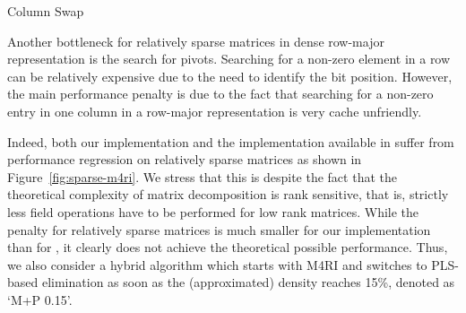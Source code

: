 \begin{algorithm}[htbp]
\caption{Column Swap}
\label{alg:swap} 
\end{algorithm}

Another bottleneck for relatively sparse matrices in dense row-major representation is the search for pivots. Searching for a non-zero element in a row can be relatively expensive due to the need to identify the bit position. However, the main performance penalty is due to the fact that searching for a non-zero entry in one column in a row-major representation is very cache unfriendly.

Indeed, both our implementation and the implementation available in \Magma suffer from performance regression on relatively sparse matrices as shown in Figure~\ref{fig:sparse-m4ri}. We stress that this is despite the fact that the theoretical complexity of matrix decomposition is rank sensitive, that is, strictly less field operations have to be performed for low rank matrices. While the penalty for relatively sparse matrices is much smaller for our implementation than for \Magma, it clearly does not achieve the theoretical possible performance. Thus, we also consider 
a hybrid algorithm which starts with M4RI and switches to PLS-based elimination as soon as the (approximated) density reaches 15\%, denoted as `M+P 0.15'.

